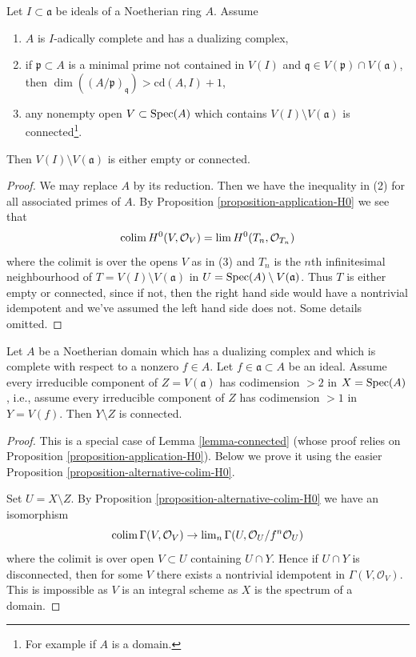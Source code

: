 \begin{lemma}
\label{lemma-connected}
Let $I \subset \mathfrak a$ be ideals of a Noetherian ring $A$.
Assume
\begin{enumerate}
\item $A$ is $I$-adically complete and has a dualizing complex,
\item if $\mathfrak p \subset A$ is a minimal prime not contained
in $V(I)$ and $\mathfrak q \in V(\mathfrak p) \cap V(\mathfrak a)$, then
$\dim((A/\mathfrak p)_\mathfrak q) > \text{cd}(A, I) + 1$,
\item any nonempty open $V \subset \mathop{\mathrm{Spec}}(A)$ which contains
$V(I) \setminus V(\mathfrak a)$ is connected\footnote{For example
if $A$ is a domain.}.
\end{enumerate}
Then $V(I) \setminus V(\mathfrak a)$ is either empty or connected.
\end{lemma}

\begin{proof}
We may replace $A$ by its reduction. Then we have the inequality
in (2) for all associated primes of $A$. By
Proposition \ref{proposition-application-H0} we see that
$$
\mathop{\mathrm{colim}}\nolimits H^0(V, \mathcal{O}_V) = \mathop{\mathrm{lim}}\nolimits H^0(T_n, \mathcal{O}_{T_n})
$$
where the colimit is over the opens $V$ as in (3) and $T_n$ is the
$n$th infinitesimal neighbourhood of $T = V(I) \setminus V(\mathfrak a)$
in $U = \mathop{\mathrm{Spec}}(A) \setminus V(\mathfrak a)$. Thus $T$ is either empty
or connected, since if not, then the right hand side would have a
nontrivial idempotent and we've assumed the left hand side does not.
Some details omitted.
\end{proof}

\begin{lemma}
\label{lemma-H0}
Let $A$ be a Noetherian domain which has a dualizing complex
and which is complete with respect to a nonzero $f \in A$.
Let $f \in \mathfrak a \subset A$ be an ideal.
Assume every irreducible component of $Z = V(\mathfrak a)$
has codimension $> 2$ in $X = \mathop{\mathrm{Spec}}(A)$, i.e., assume every
irreducible component of $Z$ has codimension $> 1$ in $Y = V(f)$.
Then $Y \setminus Z$ is connected.
\end{lemma}

\begin{proof}
This is a special case of Lemma \ref{lemma-connected} (whose proof
relies on Proposition \ref{proposition-application-H0}). Below we
prove it using the easier Proposition \ref{proposition-alternative-colim-H0}.

\medskip\noindent
Set $U = X \setminus Z$. By Proposition \ref{proposition-alternative-colim-H0}
we have an isomorphism
$$
\mathop{\mathrm{colim}}\nolimits \Gamma(V, \mathcal{O}_V) \to
\mathop{\mathrm{lim}}\nolimits_n \Gamma(U, \mathcal{O}_U/f^n \mathcal{O}_U)
$$
where the colimit is over open $V \subset U$ containing $U \cap Y$.
Hence if $U \cap Y$ is disconnected, then for some $V$ there exists
a nontrivial idempotent in $\Gamma(V, \mathcal{O}_V)$. This is impossible
as $V$ is an integral scheme as $X$ is the spectrum of a domain.
\end{proof}






